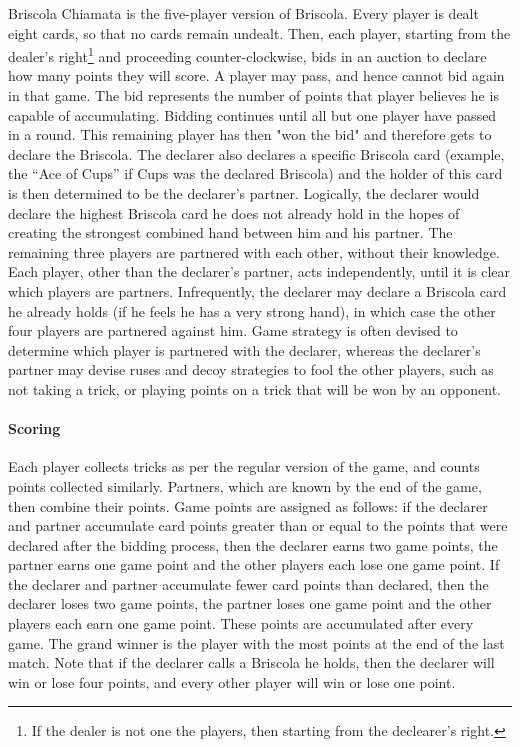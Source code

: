 \documentclass[a4paper]{article}
\begin{document}
Briscola Chiamata is the five-player version of Briscola. Every player is dealt eight cards, so that no cards remain undealt. Then, each player, starting from the dealer's right\footnote{If the dealer is not one the players, then starting from the declearer's right.} and proceeding counter-clockwise, bids in an auction to declare how many points they will score. A player may pass, and hence cannot bid again in that game. The bid represents the number of points that player believes he is capable of accumulating. Bidding continues until all but one player have passed in a round. This remaining player has then "won the bid" and therefore gets to declare the Briscola. The declarer also declares a specific Briscola card (example, the ``Ace of Cups'' if Cups was the declared Briscola) and the holder of this card is then determined to be the declarer's partner. Logically, the declarer would declare the highest Briscola card he does not already hold in the hopes of creating the strongest combined hand between him and his partner.
The remaining three players are partnered with each other, without their knowledge. Each player, other than the declarer's partner, acts independently, until it is clear which players are partners. Infrequently, the declarer may declare a Briscola card he already holds (if he feels he has a very strong hand), in which case the other four players are partnered against him.
Game strategy is often devised to determine which player is partnered with the declarer, whereas the declarer's partner may devise ruses and decoy strategies to fool the other players, such as not taking a trick, or playing points on a trick that will be won by an opponent.

\paragraph{Scoring}

Each player collects tricks as per the regular version of the game, and counts points collected similarly. Partners, which are known by the end of the game, then combine their points. Game points are assigned as follows: if the declarer and partner accumulate card points greater than or equal to the points that were declared after the bidding process, then the declarer earns two game points, the partner earns one game point and the other players each lose one game point. If the declarer and partner accumulate fewer card points than declared, then  the declarer loses two game points, the partner loses one game point and the other players each earn one game point. These points are accumulated after every game. The grand winner is the player with the most points at the end of the last match. Note that if the declarer calls a Briscola he holds, then the declarer will win or lose four points, and every other player will win or lose one point.
\end{document}
